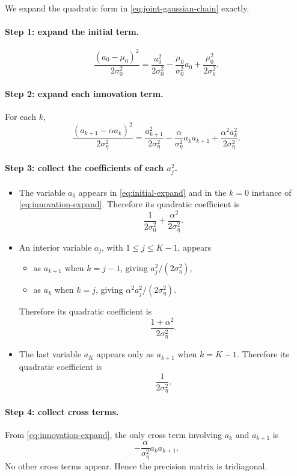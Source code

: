 \documentclass[11pt,a4paper]{article}
\begin{document}
We expand the quadratic form in \eqref{eq:joint-gaussian-chain} exactly.

\paragraph{Step 1: expand the initial term.}
\begin{equation}
\frac{(a_0-\mu_0)^2}{2\sigma_0^2}
=
\frac{a_0^2}{2\sigma_0^2}
-\frac{\mu_0}{\sigma_0^2} a_0
+\frac{\mu_0^2}{2\sigma_0^2}.
\label{eq:initial-expand}
\end{equation}

\paragraph{Step 2: expand each innovation term.}
For each $k$,
\begin{equation}
\frac{(a_{k+1}-\alpha a_k)^2}{2\sigma_\eta^2}
=
\frac{a_{k+1}^2}{2\sigma_\eta^2}
-\frac{\alpha}{\sigma_\eta^2} a_k a_{k+1}
+\frac{\alpha^2 a_k^2}{2\sigma_\eta^2}.
\label{eq:innovation-expand}
\end{equation}

\paragraph{Step 3: collect the coefficients of each $a_j^2$.}
\begin{itemize}[leftmargin=1.4em]
\item The variable $a_0$ appears in \eqref{eq:initial-expand} and in the $k=0$ instance of \eqref{eq:innovation-expand}. Therefore its quadratic coefficient is
\[
\frac{1}{2\sigma_0^2} + \frac{\alpha^2}{2\sigma_\eta^2}.
\]
\item An interior variable $a_j$, with $1\le j\le K-1$, appears
\begin{itemize}[leftmargin=1.2em]
\item as $a_{k+1}$ when $k=j-1$, giving $a_j^2/(2\sigma_\eta^2)$,
\item as $a_k$ when $k=j$, giving $\alpha^2 a_j^2/(2\sigma_\eta^2)$.
\end{itemize}
Therefore its quadratic coefficient is
\[
\frac{1+\alpha^2}{2\sigma_\eta^2}.
\]
\item The last variable $a_K$ appears only as $a_{k+1}$ when $k=K-1$. Therefore its quadratic coefficient is
\[
\frac{1}{2\sigma_\eta^2}.
\]
\end{itemize}

\paragraph{Step 4: collect cross terms.}
From \eqref{eq:innovation-expand}, the only cross term involving $a_k$ and $a_{k+1}$ is
\begin{equation}
-\frac{\alpha}{\sigma_\eta^2} a_k a_{k+1}.
\label{eq:cross-term}
\end{equation}
No other cross terms appear. Hence the precision matrix is tridiagonal.
\end{document}
